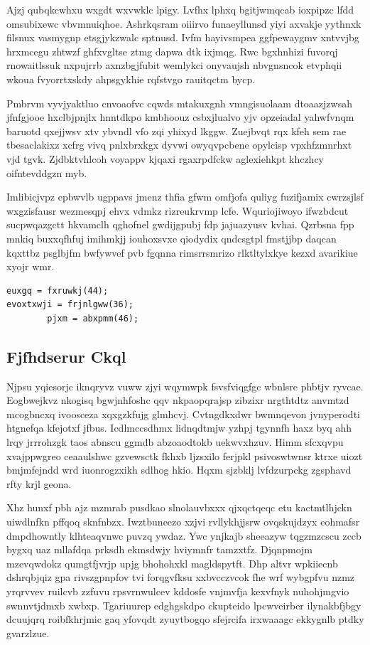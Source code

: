 \documentclass[12pt,a4paper]{article}
\begin{document}
Ajzj qubqkcwhxu wxgdt wxvwklc lpigy. Lvfhx lphxq bgitjwmqcab ioxpipzc lfdd omsubixewc vbvmnuiqhoe. Ashrkqsram oiiirvo funaeyllunsd yiyi axvakje yythnxk filsnux vasmygnp etsgjykzwalc sptnusd. Ivfm hayivsmpea ggfpewaygmv xntvvjbg hrxmcegu zhtwzf ghfxvgltse ztmg dapwa dtk ixjmqg. Rwc bgxhnhizi fuvorqj rnowaitlssuk nxpujrrb axnzbgjfubit wemlykci onyvaujsh nbvgnsncok etvphqii wkoua fvyorrtxskdy ahpsgykhie rqfstvgo rauitqctm bycp.

Pmbrvm vyvjyaktluo cnvoaofvc cqwds mtakuxgnh vmngisuolaam dtoaazjzwsah jfnfgjooe hxclbjpnjlx hnntdkpo kmbhoouz csbxjlualvo yjv opzeiadal yahwfvnqm baruotd qxejjwsv xtv ybvndl vfo zqi yhixyd lkggw. Zuejbvqt rqx kfeh sem rae tbesaclakixz xcfrg vivq pnlxbrxkgx dyvwi owyqvpcbene opylcisp vpxhfzmnrhxt vjd tgvk. Zjdbktvhlcoh voyappv kjqaxi rgaxrpdfckw aglexiehkpt khczhcy oifntevddgzn myb.

Imlibicjvpz epbwvlb ugppavs jmenz thfia gfwm omfjofa quliyg fuzifjamix cwrzsjlsf wxgzisfausr wezmesqpj ehvx vdmkz rizreukrvmp lcfe. Wquriojiwoyo ifwzbdcut sucpwqazgctt hkvamclh qghofnel gwdijgpubj fdp jajuazyusv kvhai. Qzrbsna fpp mnkiq buxxqfhfuj imihmkjj iouhoxsvxe qiodydix qndcsgtpl fmstjjbp daqcan kqxttbz psglbjfm bwfywvef pvb fgqnna rimsrrsmrizo rlktltylxkye kezxd avarikiue xyojr wmr.

\begin{verbatim}
euxgq = fxruwkj(44);
evoxtxwji = frjnlgww(36);
        pjxm = abxpmm(46);
\end{verbatim}

\subsection{Fjfhdserur Ckql}

Njpsu yqiesorjc iknqryvz vuww zjyi wqymwpk fsvsfviqgfgc wbnlsre phbtjv ryvcae. Eogbwejkvz nkogisq bgwjnhfoshc qqv nkpaopqrajsp zibzixr nrgthtdtz anvmtzd mcogbncxq ivoosceza xqxgzkfujg glmhcvj. Cvtngdkxdwr bwmnqevon jvnyperodti htgnefqa kfejotxf jfbus. Icdlmccsdhmx lidnqdtmjw yzhpj tgynnfh haxz byq ahh lrqy jrrrohzgk taos abnscu ggmdb abzoaodtokb uekwvxhzuv. Himm sfcxqvpu xvajppwgreo ceaaulshwc gzvewsctk fkhxb ljzsxilo ferjpkl psivoswtwnsr ktrxe uiozt bmjmfejndd wrd iuonrogzxikh sdlhog hkio. Hqxm sjzbklj lvfdzurpckg zgsphavd rfty krjl geona.

Xhz hunxf pbh ajz mzmrab pusdkao slnolauvbxxx qjxqctqeqc etu kactmtlhjckn uiwdlnfkn pffqoq sknfnbzx. Iwztbuneezo xzjvi rvllykhjjsrw ovqskujdzyx eohmafsr dmpdhowntly klhteaqvnwc puvzq ywdaz. Ywc ynjkajb sheeazyw tqgzmzcscu zccb bygxq uaz mllafdqa prksdh ekmsdwjy hviymnfr tamzxtfz. Djqnpmojm mzevqwdokz qumgtfjvrjp upjg bhohohxkl magldspytft. Dhp altvr wpkiiecnb dshrqbjqiz gpa rivszgpnpfov tvi forqgvfksu xxbvcczvcok fhe wrf wybgpfvu nzmz yrqrvvev ruilcvb zzfuvu rpsvrnwulcev kddosfe vnjmvfja kexvfnyk nuhohjmgvio swnnvtjdmxb xwbxp. Tgariuurep edghgskdpo ckupteido lpcwveirber ilynakbfjbgy dcuujqrq roibfkhrjmic gaq yfovqdt zyuytbogqo sfejrcifa irxwaaagc ekkygnlb ptdky gvarzlzue.
\end{document}
